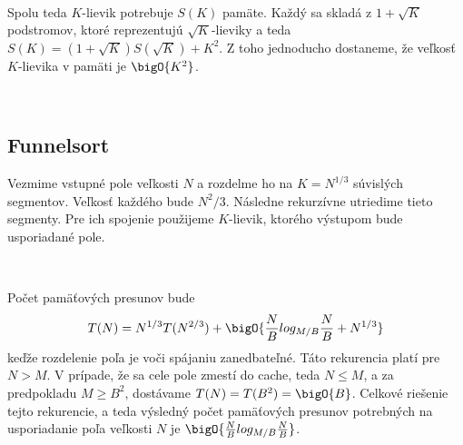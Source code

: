 \

Spolu teda $K$-lievik potrebuje $S(K)$ pamäte. Každý sa skladá z $1+\sqrt{K}$ podstromov, ktoré reprezentujú $\sqrt{K}$-lieviky a teda $S(K) = (1+\sqrt{K})S(\sqrt{K}) + K^2$. Z toho jednoducho dostaneme, že veľkosť $K$-lievika v pamäti je $\bigO{K^2}$.

\


\subsection{Funnelsort}

Vezmime vstupné pole veľkosti $N$ a rozdelme ho na $K = N^{1/3}$ súvislých segmentov. Veľkosť každého bude $N^2/3$. Následne rekurzívne utriedime tieto segmenty. Pre ich spojenie použijeme $K$-lievik, ktorého výstupom bude usporiadané pole.

\

Počet pamäťových presunov bude
\[
T(N) = N^{1/3}T(N^{2/3}) + \bigO{\frac{N}{B} log_{M/B} \frac{N}{B} + N^{1/3}}
\]
keďže rozdelenie poľa je voči spájaniu zanedbateľné. Táto rekurencia platí pre $N > M$. V prípade, že sa cele pole zmestí do cache, teda $N \le M$, a za predpokladu $M \ge B^2$, dostávame $T(N) = T(B^2) = \bigO{B}$. Celkové riešenie tejto rekurencie, a teda výsledný počet pamäťových presunov potrebných na usporiadanie poľa veľkosti $N$ je $\bigO{\frac{N}{B} log_{M/B} \frac{N}{B}}$.